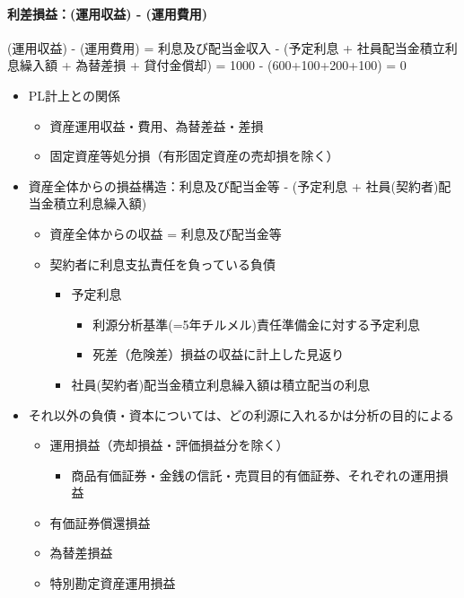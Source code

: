 \documentclass[report,gutter=10mm,fore-edge=10mm,uplatex,dvipdfmx]{jlreq}
\begin{document}
\paragraph{利差損益：(運用収益) -
(運用費用)}

(運用収益) - (運用費用) = 利息及び配当金収入 - (予定利息 +
社員配当金積立利息繰入額 + 為替差損 + 貸付金償却) = 1000 -
(600+100+200+100) = 0

\begin{itemize}
\tightlist
\item
  PL計上との関係

  \begin{itemize}
  \tightlist
  \item
    資産運用収益・費用、為替差益・差損
  \item
    固定資産等処分損（有形固定資産の売却損を除く）
  \end{itemize}
\item
  資産全体からの損益構造：利息及び配当金等 - (予定利息 +
  社員(契約者)配当金積立利息繰入額)

  \begin{itemize}
  \tightlist
  \item
    資産全体からの収益 = 利息及び配当金等
  \item
    契約者に利息支払責任を負っている負債

    \begin{itemize}
    \tightlist
    \item
      予定利息

      \begin{itemize}
      \tightlist
      \item
        利源分析基準(=5年チルメル)責任準備金に対する予定利息
      \item
        死差（危険差）損益の収益に計上した見返り
      \end{itemize}
    \item
      社員(契約者)配当金積立利息繰入額は積立配当の利息
    \end{itemize}
  \end{itemize}
\item
  それ以外の負債・資本については、どの利源に入れるかは分析の目的による

  \begin{itemize}
  \tightlist
  \item
    運用損益（売却損益・評価損益分を除く）

    \begin{itemize}
    \tightlist
    \item
      商品有価証券・金銭の信託・売買目的有価証券、それぞれの運用損益
    \end{itemize}
  \item
    有価証券償還損益
  \item
    為替差損益
  \item
    特別勘定資産運用損益
  \end{itemize}
\end{itemize}
\end{document}
